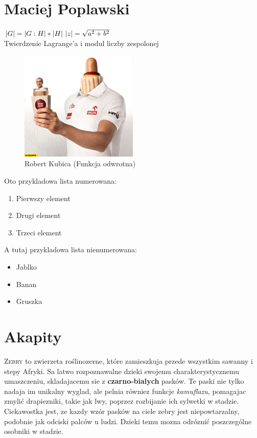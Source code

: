 \section{Maciej Poplawski}
\begin{math}
\left| G \right| = \left| G : H \right| * \left| H \right|
\\
\left| z \right| = \sqrt{a^2 + b^2}
\end{math} \\
Twierdzenie Lagrange'a i modul liczby zespolonej

\begin{figure}[h]
    \centering
    \includegraphics[width=0.5\textwidth]{pictures/driver.jpg} 
    \caption{Robert Kubica (Funkcja odwrotna)}
    \label{fig:obrazek}
\end{figure}

Oto przykladowa lista numerowana:

\begin{enumerate}
    \item Pierwszy element
    \item Drugi element
    \item Trzeci element
\end{enumerate}

A tutaj przykladowa lista nienumerowana:

\begin{itemize}
    \item Jablko
    \item Banan
    \item Gruszka
\end{itemize}



\section{Akapity}

\textsc{Zebry} to zwierzeta roślinozerne, które zamieszkuja przede wszystkim sawanny i stepy Afryki. Sa latwo rozpoznawalne dzieki swojemu charakterystycznemu umaszczeniu, skladajacemu sie z \textbf{czarno-bialych} pasków. Te paski nie tylko nadaja im unikalny wyglad, ale pelnia równiez funkcje \textit{kamuflazu}, pomagajac zmylić drapiezniki, takie jak lwy, poprzez rozbijanie ich sylwetki w stadzie. Ciekawostka jest, ze kazdy wzór pasków na ciele zebry jest niepowtarzalny, podobnie jak odciski palców u ludzi. Dzieki temu mozna odróznić poszczególne osobniki w stadzie.

